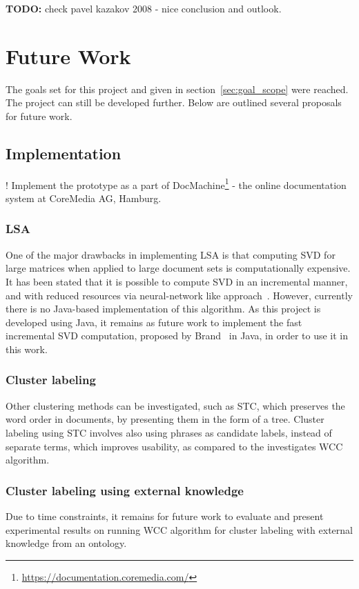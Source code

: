 \textbf{TODO:} check pavel kazakov 2008 - nice conclusion and outlook. \\

\section{Future Work}
The goals set for this project and given in section~\ref{sec:goal_scope} were reached. The project can still be developed further. Below are outlined several proposals for future work. \\

\subsection{Implementation}

! Implement the prototype as a part of DocMachine\footnote{\url{https://documentation.coremedia.com/}} - the online documentation system at CoreMedia AG, Hamburg.

\subsubsection{LSA}
One of the major drawbacks in implementing \gls{LSA} is that computing \gls{SVD} for large matrices when applied to large document sets is computationally expensive. It has been stated that it is possible to compute \gls{SVD} in an incremental manner, and with reduced resources via neural-network like approach~\cite{brand06}. However, currently there is no Java-based implementation of this algorithm. As this project is developed using Java, it remains as future work to implement the fast incremental \gls{SVD} computation, proposed by Brand~\cite{brand06} in Java, in order to use it in this work. \\

\subsubsection{Cluster labeling}
Other clustering methods can be investigated, such as \gls{STC}, which preserves the word order in documents, by presenting them in the form of a tree. Cluster labeling using \gls{STC} involves also using phrases as candidate labels, instead of separate terms, which improves usability, as compared 
to the investigates \gls{WCC} algorithm. \\

\subsubsection{Cluster labeling using external knowledge}
Due to time constraints, it remains for future work to evaluate and present experimental results on running \gls{WCC} algorithm for cluster labeling with external knowledge from an ontology. \\

